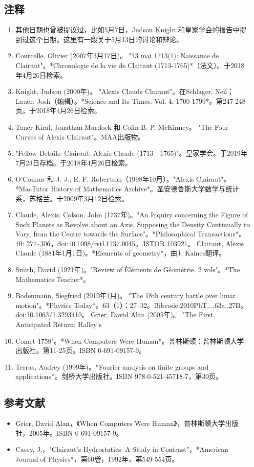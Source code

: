\subsection{注释}  
\begin{enumerate}
\item 其他日期也曾被提议过，比如5月7日，Judson Knight 和皇家学会的报告中提到过这个日期。这里有一段关于5月13日的讨论和辩论。  
\item Courcelle, Olivier (2007年3月17日)。 "13 mai 1713(1): Naissance de Clairaut"。*Chronologie de la vie de Clairaut (1713-1765)*（法文）。于2018年4月26日检索。  
\item Knight, Judson (2000年)。 "Alexis Claude Clairaut"。在Schlager, Neil；Lauer, Josh（编辑）。*Science and Its Times, Vol. 4: 1700-1799*。第247-248页。于2018年4月26日检索。  
\item Taner Kiral, Jonathan Murdock 和 Colin B. P. McKinney。 "The Four Curves of Alexis Clairaut"。MAA出版物。  
\item "Fellow Details: Clairaut; Alexis Claude (1713 - 1765)"。皇家学会。于2019年7月23日存档。于2018年4月26日检索。  
\item O'Connor 和 J. J.; E. F. Robertson（1998年10月）。"Alexis Clairaut"。*MacTutor History of Mathematics Archive*。圣安德鲁斯大学数学与统计系，苏格兰。于2009年3月12日检索。  
\item Claude, Alexis; Colson, John (1737年)。"An Inquiry concerning the Figure of Such Planets as Revolve about an Axis, Supposing the Density Continually to Vary, from the Centre towards the Surface"。*Philosophical Transactions*。40: 277–306。doi:10.1098/rstl.1737.0045。JSTOR 103921。  
Clairaut, Alexis Claude (1881年1月1日)。*Elements of geometry*，由J. Kaines翻译。  
\item Smith, David (1921年)。"Review of Èléments de Géométrie. 2 vols"。*The Mathematics Teacher*。  
\item Bodenmann, Siegfried (2010年1月)。 "The 18th century battle over lunar motion"。*Physics Today*。63（1）：27–32。Bibcode:2010PhT....63a..27B。doi:10.1063/1.3293410。  
Grier, David Alan (2005年)。 "The First Anticipated Return: Halley's \item Comet 1758"。*When Computers Were Human*。普林斯顿：普林斯顿大学出版社。第11-25页。ISBN 0-691-09157-9。  
\item Terras, Audrey (1999年)。*Fourier analysis on finite groups and applications*。剑桥大学出版社。ISBN 978-0-521-45718-7，第30页。
\end{enumerate}
\subsection{参考文献}  
\begin{itemize}
\item Grier, David Alan，《When Computers Were Human》，普林斯顿大学出版社，2005年。ISBN 0-691-09157-9。  
\item Casey, J.，"Clairaut's Hydrostatics: A Study in Contrast"，*American Journal of Physics*，第60卷，1992年，第549-554页。
\end{itemize}

